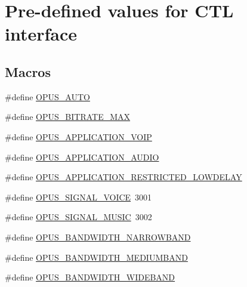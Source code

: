 \hypertarget{group__opus__ctlvalues}{}\section{Pre-\/defined values for C\+TL interface}
\label{group__opus__ctlvalues}
\subsection*{Macros}
\begin{DoxyCompactItemize}
\item 
\#define \hyperlink{group__opus__ctlvalues_ga1c5b3244b018ff4548d2d6bffa418472}{O\+P\+U\+S\+\_\+\+A\+U\+TO}
\item 
\#define \hyperlink{group__opus__ctlvalues_gaeadbaa3b4b9e15d39cd1d6e7d91519e5}{O\+P\+U\+S\+\_\+\+B\+I\+T\+R\+A\+T\+E\+\_\+\+M\+AX}
\item 
\#define \hyperlink{group__opus__ctlvalues_ga07884aa018303a419d1f7acb2f3fa669}{O\+P\+U\+S\+\_\+\+A\+P\+P\+L\+I\+C\+A\+T\+I\+O\+N\+\_\+\+V\+O\+IP}
\item 
\#define \hyperlink{group__opus__ctlvalues_ga5909f7cb35c04f1110026c6889edd345}{O\+P\+U\+S\+\_\+\+A\+P\+P\+L\+I\+C\+A\+T\+I\+O\+N\+\_\+\+A\+U\+D\+IO}
\item 
\#define \hyperlink{group__opus__ctlvalues_ga592232fb39db60c1369989c5c5d19a07}{O\+P\+U\+S\+\_\+\+A\+P\+P\+L\+I\+C\+A\+T\+I\+O\+N\+\_\+\+R\+E\+S\+T\+R\+I\+C\+T\+E\+D\+\_\+\+L\+O\+W\+D\+E\+L\+AY}
\item 
\#define \hyperlink{group__opus__ctlvalues_ga085a116fed816373d3b9eae28df49404}{O\+P\+U\+S\+\_\+\+S\+I\+G\+N\+A\+L\+\_\+\+V\+O\+I\+CE}~3001
\item 
\#define \hyperlink{group__opus__ctlvalues_gaa0c228c664b6d426f4c213e3a5350889}{O\+P\+U\+S\+\_\+\+S\+I\+G\+N\+A\+L\+\_\+\+M\+U\+S\+IC}~3002
\item 
\#define \hyperlink{group__opus__ctlvalues_ga607dd310958b9c7d545d005e4572d47f}{O\+P\+U\+S\+\_\+\+B\+A\+N\+D\+W\+I\+D\+T\+H\+\_\+\+N\+A\+R\+R\+O\+W\+B\+A\+ND}
\item 
\#define \hyperlink{group__opus__ctlvalues_ga53a2aff4dc0ee23682927ca568c422a3}{O\+P\+U\+S\+\_\+\+B\+A\+N\+D\+W\+I\+D\+T\+H\+\_\+\+M\+E\+D\+I\+U\+M\+B\+A\+ND}
\item 
\#define \hyperlink{group__opus__ctlvalues_gac698e5d1281a3632251d2a4ead48afb9}{O\+P\+U\+S\+\_\+\+B\+A\+N\+D\+W\+I\+D\+T\+H\+\_\+\+W\+I\+D\+E\+B\+A\+ND}
\item 

\end{DoxyCompactItemize}
